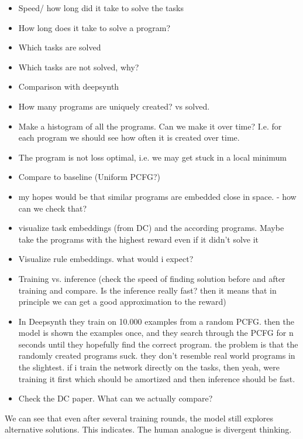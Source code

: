 \begin{itemize}
    \item Speed/ how long did it take to solve the tasks
    \item How long does it take to solve a program?
    \item Which tasks are solved
    \item Which tasks are not solved, why?
    \item Comparison with deepsynth
    \item How many programs are uniquely created? vs solved.
	\item Make a histogram of all the programs. Can we make it over time? I.e. for each program we should see how often it is created over time. 
    \item The program is not loss optimal, i.e. we may get stuck in a local minimum
    \item Compare to baseline (Uniform PCFG?)
    \item my hopes would be that similar programs are embedded close in space. - how can we check that?
    \item visualize task embeddings (from DC) and the according programs. Maybe take the programs with the highest reward even if it didn't solve it
    \item Visualize rule embeddings. what would i expect? 
    \item Training vs. inference (check the speed of finding solution before and after training and compare. Is the inference really fast? then it means that in principle we can get a good approximation to the reward)
    \item In Deepsynth they train on 10.000 examples from a random PCFG. then the model is shown the examples once, and they search through the PCFG for n seconds until they hopefully find the correct program. the problem is that the randomly created programs suck. they don't resemble real world programs in the slightest. if i train the network directly on the tasks, then yeah, were training it first which should be amortized and then inference should be fast.
    \item Check the DC paper. What can we actually compare?
\end{itemize}




We can see that even after several training rounds, the model still explores alternative solutions. This indicates. The human analogue is divergent thinking. 







